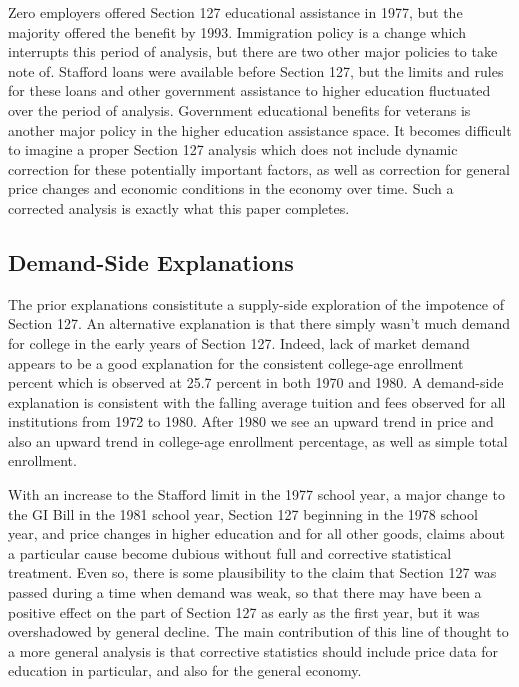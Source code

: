 \documentclass[review]{elsarticle}
\begin{document}
    Zero employers offered Section 127 educational assistance in 1977, but the majority offered the benefit by 1993.
    Immigration policy is a change which interrupts this period of analysis, but there are two other major policies to take note of.
    Stafford loans were available before Section 127, but the limits and rules for these loans and other government assistance to higher education fluctuated over the period of analysis.
    Government educational benefits for veterans is another major policy in the higher education assistance space.
    It becomes difficult to imagine a proper Section 127 analysis which does not include dynamic correction for these potentially important factors,
    as well as correction for general price changes and economic conditions in the economy over time.
    Such a corrected analysis is exactly what this paper completes.

    \subsection{Demand-Side Explanations}
    The prior explanations consistitute a supply-side exploration of the impotence of Section 127.
    An alternative explanation is that there simply wasn't much demand for college in the early years of Section 127.
    Indeed, lack of market demand appears to be a good explanation for the consistent college-age enrollment percent
    which is observed at 25.7 percent in both 1970 and 1980.
    A demand-side explanation is consistent with the falling average tuition and fees observed for all institutions from 1972 to 1980.
    After 1980 we see an upward trend in price and also an upward trend in college-age enrollment percentage, as well as simple total enrollment.

    With an increase to the Stafford limit in the 1977 school year,
    a major change to the GI Bill in the 1981 school year,
    Section 127 beginning in the 1978 school year,
    and price changes in higher education and for all other goods,
    claims about a particular cause become dubious without full and corrective statistical treatment.
    Even so,
    there is some plausibility to the claim that Section 127 was passed during a time when demand was weak,
    so that there may have been a positive effect on the part of Section 127 as early as the first year,
    but it was overshadowed by general decline.
    The main contribution of this line of thought to a more general analysis is that corrective statistics should include price data
    for education in particular, and also for the general economy.
\end{document}
